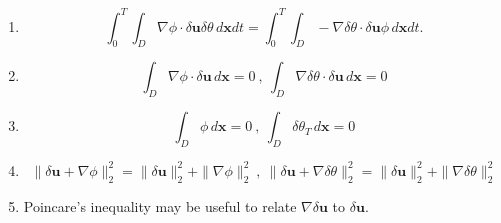 \documentclass[11pt]{article}
\def \iint {\int_{0}^{T}\int_{D}}
\begin{document}
\begin{flushleft}
\begin{enumerate}
\item \[
\iint \nabla\phi\cdot\delta\mathbf{u}\delta \theta \, d\mathbf{x}dt= 
\iint -\nabla\delta \theta \cdot\delta\mathbf{u} \phi \, d\mathbf{x}dt.
\]
\item 
\[
\int_{D} \nabla \phi \cdot \delta \mathbf{u} \, d\mathbf{x}=0 \: , \:
\int_{D} \nabla \delta \theta \cdot \delta \mathbf{u} \, d\mathbf{x}=0  
\]
\item 
\[
\int_{D} \phi \, d\mathbf{x}=0 \: , \:
\int_{D} \delta \theta _{T} \, d\mathbf{x}=0  
\]
\item \[\| \delta\mathbf{u}+\nabla\phi \|_{2}^{2}=\|\delta\mathbf{u}\|_{2}^{2}+\|\nabla\phi\|_{2}^{2} \: , \: 
\| \delta\mathbf{u}+\nabla\delta\theta \|_{2}^{2}=\|\delta\mathbf{u}\|_{2}^{2}+\|\nabla\delta\theta\|_{2}^{2}
\]
\item Poincare's inequality may be useful to relate $\nabla \delta  \mathbf{u}$ to $\delta \mathbf{u}$.
\end{enumerate}



\end{flushleft}
\end{document}
